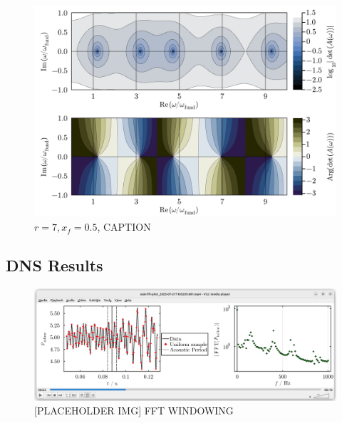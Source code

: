 \begin{figure}[t]
\centering
\includegraphics[scale=0.35]{assets/graphs/r=7_xf=05_complex_harmonics.pdf}
\caption{$r = 7, x_f = 0.5$, CAPTION}
\label{fig:flame-harmonics-complex}
\end{figure}




\subsection{DNS Results}





\begin{figure}[t]
\centering
\includegraphics[scale=0.35]{assets/graphs/fft-windowing.png}
\caption{[PLACEHOLDER IMG] FFT WINDOWING}
\label{fig:windowing}
\end{figure}

